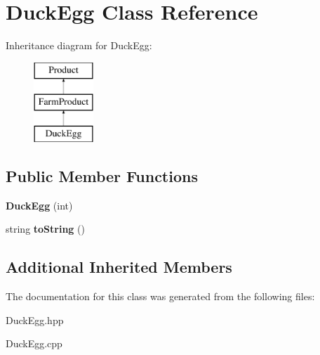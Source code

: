 \hypertarget{class_duck_egg}{}\section{Duck\+Egg Class Reference}
\label{class_duck_egg}
Inheritance diagram for Duck\+Egg\+:\begin{figure}[H]
\begin{center}
\leavevmode
\includegraphics[height=3.000000cm]{class_duck_egg}
\end{center}
\end{figure}
\subsection*{Public Member Functions}
\begin{DoxyCompactItemize}
\item 
\mbox{\label{class_duck_egg_a61d170e2f530c0719ec43dabcedb81a5}} 
{\bfseries Duck\+Egg} (int)
\item 
\mbox{\label{class_duck_egg_ab1be2a403c714ef3d16595cd46b6c8d7}} 
string {\bfseries to\+String} ()
\end{DoxyCompactItemize}
\subsection*{Additional Inherited Members}


The documentation for this class was generated from the following files\+:\begin{DoxyCompactItemize}
\item 
Duck\+Egg.\+hpp\item 
Duck\+Egg.\+cpp\end{DoxyCompactItemize}
